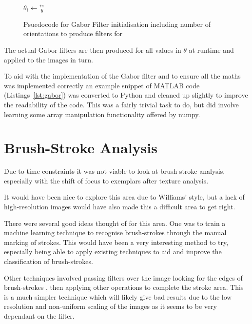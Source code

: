 \begin{figure}[h]
\begin{algorithmic}
 
\State $\theta_i \gets \frac{i\pi}{b}$ 
\EndFor
\EndFunction
\end{algorithmic}
\caption[Psuedocode for Gabor Filter initialisation]{Psuedocode for Gabor Filter initialisation including number of orientations to produce 
filters for}\label{fig:gabor-init}
\end{figure}

The actual Gabor filters are then produced for all values in $\theta$ at runtime and applied to
the images in turn.

To aid with the implementation of the Gabor filter and to ensure all the maths was implemented 
correctly an example snippet of MATLAB code\cite{Yang2010Gabor} (Listings~\ref{lst:gabor}) was 
converted to Python and cleaned up slightly to improve the readability of the code. This was a 
fairly trivial task to do, but did involve learning some array manipulation functionality offered
by numpy.

\section{Brush-Stroke Analysis}

Due to time constraints it was not viable to look at brush-stroke analysis, especially with the
shift of focus to exemplars after texture analysis.

It would have been nice to explore this area due to Williams' style, but a lack of high-resolution
images would have also made this a difficult area to get right.

There were several good ideas thought of for this area. One was to train a machine learning 
technique to recognise brush-strokes through the manual marking of strokes. This would have been a
very interesting method to try, especially being able to apply existing techniques to aid and
improve the classification of brush-strokes.

Other techniques involved passing filters over the image looking for the edges of brush-strokes
\cite{Berezhnoy2009Automatic}, then applying other operations to complete the stroke area. This
is a much simpler technique which will likely give bad results due to the low resolution and
non-uniform scaling of the images as it seems to be very dependant on the filter.

